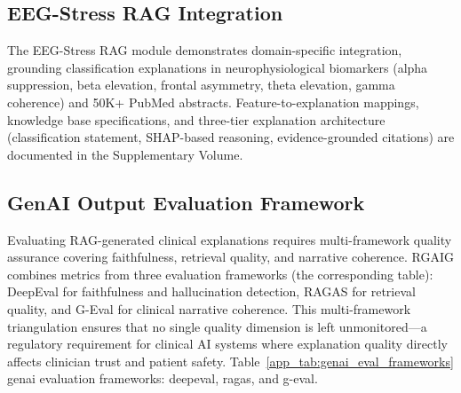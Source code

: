 \subsection{EEG-Stress RAG Integration}
\label{app_sec:eeg_stress_rag}

The EEG-Stress RAG module demonstrates domain-specific integration, grounding classification explanations in neurophysiological biomarkers (alpha suppression, beta elevation, frontal asymmetry, theta elevation, gamma coherence) and 50K+ PubMed abstracts. Feature-to-explanation mappings, knowledge base specifications, and three-tier explanation architecture (classification statement, SHAP-based reasoning, evidence-grounded citations) are documented in the Supplementary Volume.

\subsection{GenAI Output Evaluation Framework}
\label{app_sec:genai_eval}

Evaluating RAG-generated clinical explanations requires multi-framework quality assurance covering faithfulness, retrieval quality, and narrative coherence. RGAIG combines metrics from three evaluation frameworks (the corresponding table): DeepEval for faithfulness and hallucination detection, RAGAS for retrieval quality, and G-Eval for clinical narrative coherence. This multi-framework triangulation ensures that no single quality dimension is left unmonitored---a regulatory requirement for clinical AI systems where explanation quality directly affects clinician trust and patient safety.
\noindent Table~\ref{app_tab:genai_eval_frameworks} genai evaluation frameworks: deepeval, ragas, and g-eval.

